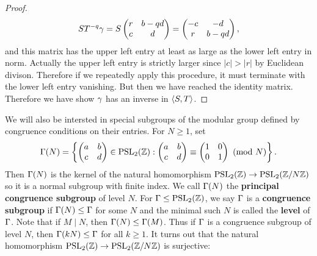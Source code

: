 \begin{proof}
        \[
          ST^{-q}\gamma = S\begin{pmatrix} r & b-qd \\ c & d \end{pmatrix} = \begin{pmatrix} -c & -d \\ r & b-qd \end{pmatrix},
        \]
        and this matrix has the upper left entry at least as large as the lower left entry in norm. Actually the upper left entry is strictly larger since $|c| > |r|$ by Euclidean divison. Therefore if we repeatedly apply this procedure, it must terminate with the lower left entry vanishing. But then we have reached the identity matrix. Therefore we have show $\gamma$ has an inverse in $\langle S,T\rangle$.
      \end{proof}

      We will also be intersted in special subgroups of the modular group defined by congruence conditions on their entries. For $N \ge 1$, set
      \[
        \Gamma(N) = \left\{\begin{pmatrix} a & b \\ c & d \end{pmatrix} \in \mathrm{PSL}_{2}(\mathbb{Z}):\begin{pmatrix} a & b \\ c & d \end{pmatrix} \equiv \begin{pmatrix} 1 & 0 \\ 0 & 1 \end{pmatrix} \ \left(\text{mod }N\right)\right\}.
      \]
      Then $\Gamma(N)$ is the kernel of the natural homomorphism $\mathrm{PSL}_{2}(\mathbb{Z}) \to \mathrm{PSL}_{2}(\mathbb{Z}/N\mathbb{Z})$ so it is a normal subgroup with finite index. We call $\Gamma(N)$ the \textbf{principal congruence subgroup} of level $N$. For $\Gamma \le \mathrm{PSL}_{2}(\mathbb{Z})$, we say $\Gamma$ is a \textbf{congruence subgroup} if $\Gamma(N) \le \Gamma$ for some $N$ and the minimal such $N$ is called the \textbf{level} of $\Gamma$. Note that if $M \mid N$, then $\Gamma(N) \le \Gamma(M)$. Thus if $\Gamma$ is a congruence subgroup of level $N$, then $\Gamma(kN) \le \Gamma$ for all $k \ge 1$. It turns out that the natural homomorphism $\mathrm{PSL}_{2}(\mathbb{Z}) \to \mathrm{PSL}_{2}(\mathbb{Z}/N\mathbb{Z})$ is surjective:

